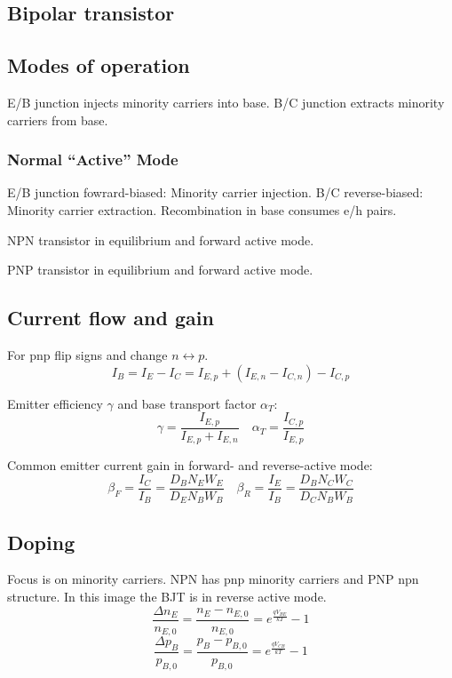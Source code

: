 \documentclass[a4paper, fontsize=8pt, landscape, DIV=1]{scrartcl}
\begin{document}
\begin{multicols*}{4}
    \section{Bipolar transistor}
    \subsection{Modes of operation}
    E/B junction injects minority carriers into base. B/C junction extracts minority carriers from base.
    

    \subsubsection{Normal ``Active'' Mode}
    E/B junction fowrard-biased: Minority carrier injection. B/C reverse-biased: Minority carrier extraction.
    Recombination in base consumes e/h pairs.
    
    NPN transistor in  equilibrium and  forward active mode.

    PNP transistor in  equilibrium and  forward active mode.

    \subsection{Current flow and gain}
    For pnp flip signs and change $n \leftrightarrow p$.
    \[I_B = I_E - I_C = I_{E,p} + (I_{E,n} - I_{C,n}) - I_{C,p}\]

    Emitter efficiency $\gamma$ and base transport factor $\alpha_T$:
    \[ \gamma = \frac{I_{E,p}}{I_{E,p} + I_{E,n}} \quad \alpha_T = \frac{I_{C,p}}{I_{E,p}} \]

    Common emitter current gain in forward- and reverse-active mode:
    \[\beta_F = \frac{I_C}{I_B} = \frac{D_BN_EW_E}{D_EN_BW_B} \quad \beta_R = \frac{I_E}{I_B} = \frac{D_BN_CW_C}{D_CN_BW_B}\]


    \subsection{Doping}
    Focus is on minority carriers. NPN has pnp minority carriers and PNP npn structure. In this image the BJT is in reverse active mode.
    \[\frac{\Delta n_E}{n_{E,0}} = \frac{n_E - n_{E,0}}{n_{E,0}} = e^{\frac{qV_{BE}}{kT}} - 1\]
    \[\frac{\Delta p_B}{p_{B,0}} = \frac{p_B - p_{B,0}}{p_{B,0}} = e^{\frac{qV_{CB}}{kT}} - 1\]


\end{multicols*}
\end{document}
